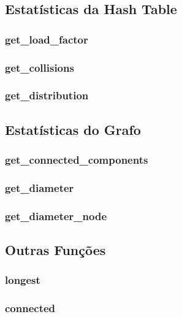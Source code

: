 \documentclass[a4paper,11pt]{article}
\begin{document}
    \subsection{Estatísticas da Hash Table}\label{subsec:estatisticas-da-hash-table}

    \subsubsection{get\_load\_factor}
    
    \subsubsection{get\_collisions}
    
    \subsubsection{get\_distribution}
    
    
    \subsection{Estatísticas do Grafo}\label{subsec:estatisticas-do-grafo}
    
    \subsubsection{get\_connected\_components}
    
    \subsubsection{get\_diameter}
    
    \subsubsection{get\_diameter\_node}
    

    \subsection{Outras Funções}\label{subsec:outras-funcoes}

    \subsubsection{longest}
    
    \subsubsection{connected}
    
\end{document}
